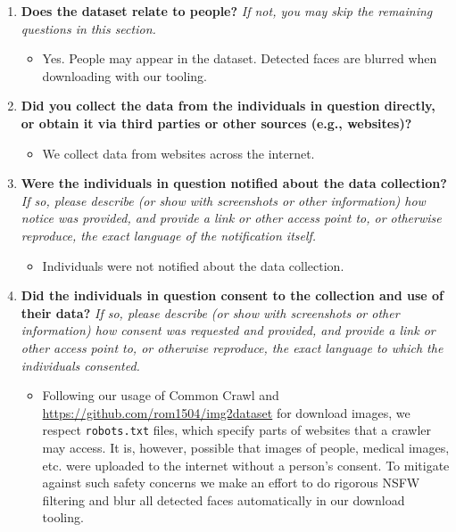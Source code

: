 \begin{enumerate}[label=Q\arabic*]
\item \textbf{Does the dataset relate to people?} \textit{If not, you may skip the remaining questions in this section.}

\begin{itemize}
\item Yes. People may appear in the dataset. Detected faces are blurred when downloading \pool with our tooling.
\end{itemize}

\item \textbf{Did you collect the data from the individuals in question directly, or obtain it via third parties or other sources (e.g., websites)?}

\begin{itemize}
\item We collect data from websites across the internet.
\end{itemize}

\item \textbf{Were the individuals in question notified about the data collection?} \textit{If so, please describe (or show with screenshots or other information) how notice was provided, and provide a link or other access point to, or otherwise reproduce, the exact language of the notification itself.}

\begin{itemize}
\item Individuals were not notified about the data collection.
\end{itemize}

\item \textbf{Did the individuals in question consent to the collection and use of their data?} \textit{If so, please describe (or show with screenshots or other information) how consent was requested and provided, and provide a link or other access point to, or otherwise reproduce, the exact language to which the individuals consented.}

\begin{itemize}
\item Following our usage of Common Crawl and \url{https://github.com/rom1504/img2dataset} for download images, we respect \texttt{robots.txt} files, which specify parts of websites that a crawler may access. It is, however, possible that images of people, medical images, etc. were uploaded to the internet without a person's consent. To mitigate against such safety concerns we make an effort to do rigorous NSFW filtering and blur all detected faces automatically in our download tooling.
\end{itemize}


\end{enumerate}
